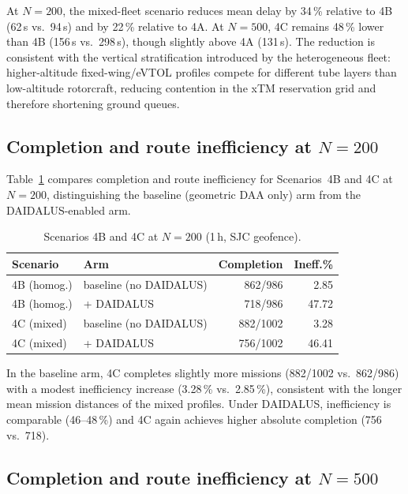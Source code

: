 \noindent At $N=200$, the mixed-fleet scenario reduces mean delay by 34\,\% relative to 4B
(62\,s vs.\ 94\,s) and by 22\,\% relative to 4A. At $N=500$, 4C remains 48\,\% lower than 4B
(156\,s vs.\ 298\,s), though slightly above 4A (131\,s). The reduction is consistent with the
vertical stratification introduced by the heterogeneous fleet: higher-altitude fixed-wing/eVTOL
profiles compete for different tube layers than low-altitude rotorcraft, reducing contention in
the xTM reservation grid and therefore shortening ground queues.

\subsection{Completion and route inefficiency at $N=200$}

Table~\ref{tab:scen4c_n200} compares completion and route inefficiency for Scenarios~4B and 4C
at $N=200$, distinguishing the baseline (geometric DAA only) arm from the DAIDALUS-enabled arm.

\begin{table}[htbp]
\caption{Scenarios 4B and 4C at $N=200$ (1\,h, SJC geofence).}
\label{tab:scen4c_n200}
\begin{center}
\begin{tabular}{|l|l|r|r|}
\hline
\textbf{Scenario} & \textbf{Arm} & \textbf{Completion} & \textbf{Ineff.\%} \\
\hline
4B (homog.) & baseline (no DAIDALUS) & 862/986  & 2.85 \\
4B (homog.) & + DAIDALUS              & 718/986  & 47.72 \\
4C (mixed)  & baseline (no DAIDALUS) & 882/1002 & 3.28 \\
4C (mixed)  & + DAIDALUS              & 756/1002 & 46.41 \\
\hline
\end{tabular}
\end{center}
\end{table}

\noindent In the baseline arm, 4C completes slightly more missions (882/1002 vs.\ 862/986) with
a modest inefficiency increase (3.28\,\% vs.\ 2.85\,\%), consistent with the longer mean mission
distances of the mixed profiles. Under DAIDALUS, inefficiency is comparable (46--48\,\%) and 4C
again achieves higher absolute completion (756 vs.\ 718).

\subsection{Completion and route inefficiency at $N=500$}


